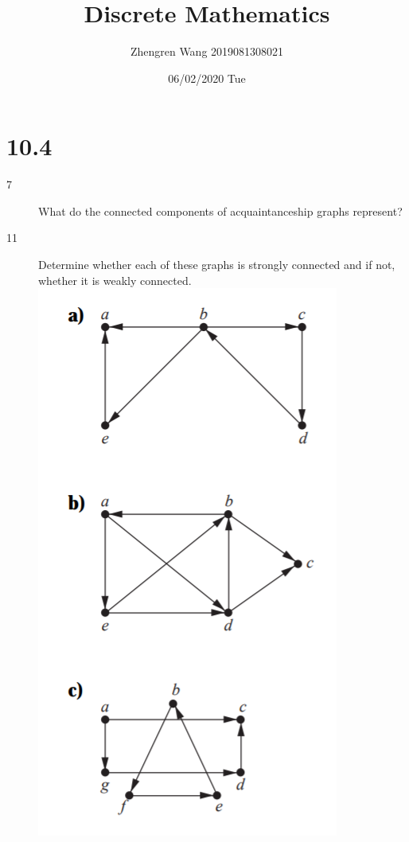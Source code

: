 \documentclass[UTF8]{article}
\title{Discrete Mathematics}
\author{Zhengren Wang 2019081308021}
\date{06/02/2020 Tue}
\begin{document}
\maketitle 

\part{10.4}
\begin{description}
    \item[7]What do the connected components of acquaintanceship graphs represent?\\



    \item[11]Determine whether each of these graphs is strongly connected and if not, whether it is weakly connected.  \\
        \includegraphics[scale=0.3]{../imgs/10_4_11.png}


\end{description}
\end{document}
